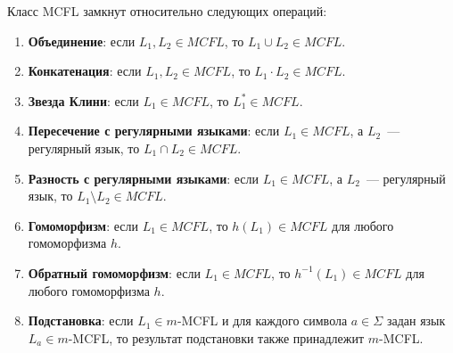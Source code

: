 \begin{theorem}
    \label{thm:mcf_closure}
    Класс MCFL замкнут относительно следующих операций:
    \begin{enumerate}
        \item \textbf{Объединение}: если $L_1, L_2 \in MCFL$, то $L_1 \cup L_2 \in MCFL$.
        \item \textbf{Конкатенация}: если $L_1, L_2 \in MCFL$, то $L_1 \cdot L_2 \in MCFL$.
        \item \textbf{Звезда Клини}: если $L_1 \in MCFL$, то $L_1^* \in MCFL$.
        \item \textbf{Пересечение с регулярными языками}: если $L_1 \in MCFL$, а $L_2$~--- регулярный язык, то $L_1 \cap L_2 \in MCFL$.
        \item \textbf{Разность с регулярными языками}: если $L_1 \in MCFL$, а $L_2$~--- регулярный язык, то $L_1 \setminus L_2 \in MCFL$.
        \item \textbf{Гомоморфизм}: если $L_1 \in MCFL$, то $h(L_1) \in MCFL$ для любого гомоморфизма $h$.
        \item \textbf{Обратный гомоморфизм}: если $L_1 \in MCFL$, то $h^{-1}(L_1) \in MCFL$ для любого гомоморфизма $h$.
        \item \textbf{Подстановка}: если $L_1 \in m$-MCFL и для каждого символа $a \in \Sigma$ задан язык $L_a \in m$-MCFL, то результат подстановки также принадлежит $m$-MCFL.
    \end{enumerate}
\end{theorem}


